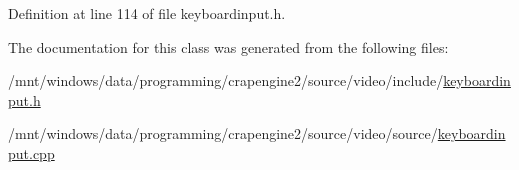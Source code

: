 Definition at line 114 of file keyboardinput.\+h.



The documentation for this class was generated from the following files\+:\begin{DoxyCompactItemize}
\item 
/mnt/windows/data/programming/crapengine2/source/video/include/\hyperlink{keyboardinput_8h}{keyboardinput.\+h}\item 
/mnt/windows/data/programming/crapengine2/source/video/source/\hyperlink{keyboardinput_8cpp}{keyboardinput.\+cpp}\end{DoxyCompactItemize}

